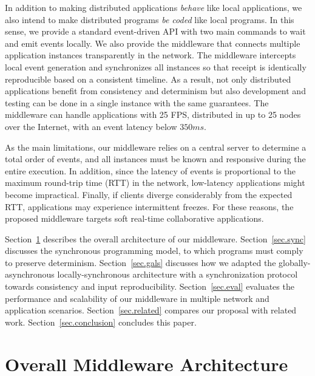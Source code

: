 \documentclass[sigplan,screen]{acmart}
\begin{document}
In addition to making distributed applications \emph{behave} like local
applications, we also intend to make distributed programs \emph{be coded} like
local programs.
In this sense, we provide a standard event-driven API with two main commands
to wait and emit events locally.
We also provide the middleware that connects multiple application instances
transparently in the network.
The middleware intercepts local event generation and synchronizes all instances
so that receipt is identically reproducible based on a consistent timeline.
As a result, not only distributed applications benefit from consistency and
determinism but also development and testing can be done in a single instance
with the same guarantees.
The middleware can handle applications with 25 FPS, distributed in up to 25
nodes over the Internet, with an event latency below $350ms$.

As the main limitations, our middleware relies on a central server to determine
a total order of events, and all instances must be known and responsive during
the entire execution.
In addition, since the latency of events is proportional to the maximum
round-trip time (RTT) in the network, low-latency applications might become
impractical.
Finally, if clients diverge considerably from the expected RTT, applications
may experience intermittent freezes.
For these reasons, the proposed middleware targets soft real-time collaborative
applications.

Section~\ref{sec.arch} describes the overall architecture of our middleware.
Section~\ref{sec.sync} discusses the synchronous programming model, to which
programs must comply to preserve determinism.
Section~\ref{sec.gals} discusses how we adapted the globally-asynchronous
locally-synchronous architecture with a synchronization protocol towards
consistency and input reproducibility.
Section~\ref{sec.eval} evaluates the performance and scalability of our
middleware in multiple network and application scenarios.
Section~\ref{sec.related} compares our proposal with related work.
Section~\ref{sec.conclusion} concludes this paper.

\section{Overall Middleware Architecture}
\label{sec.arch}
\end{document}
